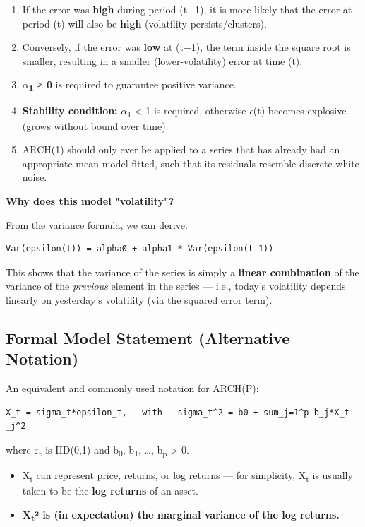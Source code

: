 \documentclass[12pt,openany]{book}
\theoremstyle{definition}
\theoremstyle{remark}
\begin{document}
\begin{enumerate}
\item If the error was \textbf{high} during period (t−1), it is more likely that the error at period (t) will also be \textbf{high} (volatility persists/clusters).
\item Conversely, if the error was \textbf{low} at (t−1), the term inside the square root is smaller, resulting in a smaller (lower-volatility) error at time (t).
\item \textbf{\ensuremath{\alpha}\textsubscript{1} ≥ 0} is required to guarantee positive variance.
\item \textbf{Stability condition:} \ensuremath{\alpha}\textsubscript{1} < 1 is required, otherwise \ensuremath{\epsilon}(t) becomes explosive (grows without bound over time).
\item ARCH(1) should only ever be applied to a series that has already had an appropriate mean model fitted, such that its residuals resemble discrete white noise.
\end{enumerate}

\textbf{Why does this model "volatility"?}

From the variance formula, we can derive:

\begin{lstlisting}[style=notesCode]
Var(epsilon(t)) = alpha0 + alpha1 * Var(epsilon(t-1))
\end{lstlisting}

This shows that the variance of the series is simply a \textbf{linear combination} of the variance of the \emph{previous} element in the series — i.e., today's volatility depends linearly on yesterday's volatility (via the squared error term).

\subsection{Formal Model Statement (Alternative Notation)}

An equivalent and commonly used notation for ARCH(P):

\begin{lstlisting}[style=notesCode]
X_t = sigma_t*epsilon_t,   with   sigma_t^2 = b0 + sum_j=1^p b_j*X_t-_j^2
\end{lstlisting}

where \ensuremath{\varepsilon}\textsubscript{t} is IID(0,1) and
b\textsubscript{0}, b\textsubscript{1}, …, b\textsubscript{p} > 0.

\begin{itemize}
\item X\textsubscript{t} can represent price, returns, or log returns — for simplicity, X\textsubscript{t} is usually taken to be the \textbf{log returns} of an asset.
\item \textbf{X\textsubscript{t}² is (in expectation) the marginal variance of the log returns.}
\end{itemize}
\end{document}
